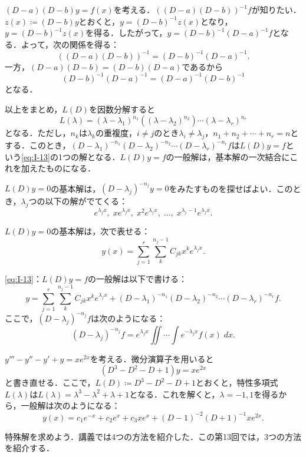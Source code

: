 \begin{example}
    $(D-a)(D-b)y=f(x)$を考える．$((D-a)(D-b))^{-1}f$が知りたい．$z(x) \coloneqq (D-b)y$とおくと，$y=(D-b)^{-1}z(x)$となり，$y=(D-b)^{-1}z(x)$を得る．したがって，$y=(D-b)^{-1}(D-a)^{-1}f$となる．よって，次の関係を得る：
    \[ ((D-a)(D-b))^{-1} = (D-b)^{-1}(D-a)^{-1}.\]
    一方，$(D-a)(D-b)=(D-b)(D-a)$であるから
    \[ (D-b)^{-1}(D-a)^{-1} = (D-a)^{-1}(D-b)^{-1}\]
    となる．
\end{example}

以上をまとめ，$L(D)$を因数分解すると
\[ L(\lambda) = (\lambda - \lambda_1)^{n_1} ((\lambda - \lambda_2)^{n_2}) \cdots (\lambda - \lambda_r)^{n_r}\]
となる．ただし，$n_k$は$\lambda_k$の重複度，$i \neq j$のとき$\lambda_i \neq \lambda_j$，$n_1+n_2+\cdots+n_r=n$とする．このとき，$(D-\lambda_1)^{-n_1} (D-\lambda_2)^{-n_2} \cdots (D-\lambda_r)^{-n_r}f$は$L(D)y=f$という\eqref{eq:I-13}の1つの解となる．$L(D)y=f$の一般解は，基本解の一次結合にこれを加えたものになる．

$L(D)y=0$の基本解は，$(D-\lambda_j)^{-n_j}y=0$をみたすものを探せばよい．このとき，$\lambda_j$つの以下の解がでてくる：
\[ e^{\lambda_j x}, \; xe^{\lambda_j x}, \; x^2e^{\lambda_j x}, \; \ldots, \; x^{\lambda_j-1}e^{\lambda_j x}.\]

$L(D)y=0$の基本解は，次で表せる：
\[ y(x) = \sum_{j=1}^{r} \sum_{k}^{n_j-1} C_{jk} x^k e^{\lambda_j x}.\]

\begin{definition}
    \eqref{eq:I-13}：$L(D)y=f$の一般解は以下で書ける：
    \[ y = \sum_{j=1}^{r} \sum_{k}^{n_j-1} C_{jk} x^k e^{\lambda_j x} + (D-\lambda_1)^{-n_1} (D-\lambda_2)^{-n_2} \cdots (D-\lambda_r)^{-n_r}f.\]
    ここで，$(D-\lambda_j)^{-n_j}f$は次のようになる：
    \[ (D-\lambda_j)^{-n_j}f = e^{\lambda_j x} \iint \cdots \int e^{-\lambda_j x} f(x) \; dx.\]
\end{definition}

\begin{example}
    $y'''-y''-y'+y=xe^{2x}$を考える．微分演算子を用いると
    \[ (D^3-D^2-D+1)y = xe^{2x}\]
    と書き直せる．ここで，$L(D) \coloneqq D^3-D^2-D+1$とおくと，特性多項式$L(\lambda)$は$L(\lambda)=\lambda^3-\lambda^2+\lambda+1$となる．これを解くと，$\lambda=-1, 1$を得るから，一般解は次のようになる：
    \[ y(x) = c_1e^{-x} + c_2e^x + c_3xe^x + (D-1)^{-2}(D+1)^{-1}xe^{2x}.\]

    特殊解を求めよう．講義では4つの方法を紹介した．この第13回では，3つの方法を紹介する．
\end{example}

